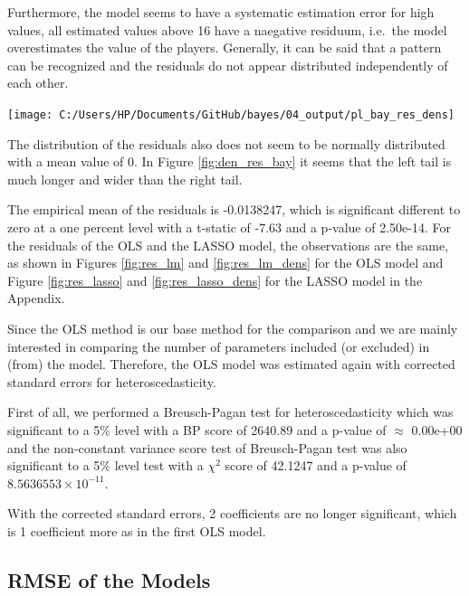 \documentclass[12pt,a4paper]{article}
\let\origfigure\figure
\let\endorigfigure\endfigure
\renewenvironment{figure}[1][2] {
    \expandafter\origfigure\expandafter[H]
} {
    \endorigfigure
}
\begin{document}
Furthermore, the model seems to have a systematic estimation error for
high values, all estimated values above 16 have a naegative residuum,
i.e.~the model overestimates the value of the players. Generally, it can
be said that a pattern can be recognized and the residuals do not appear
distributed independently of each other.

\begin{figure}

\texttt{[image: C:/Users/HP/Documents/GitHub/bayes/04\_output/pl\_bay\_res\_dens]} \hfill{}

\caption{ \label{fig:den_res_bay} Distribution of the Residuals of the Bayesian LASSO}\label{fig:fig_dens_2}
\end{figure}

The distribution of the residuals also does not seem to be normally
distributed with a mean value of 0. In Figure \ref{fig:den_res_bay} it
seems that the left tail is much longer and wider than the right tail.

The empirical mean of the residuals is -0.0138247, which is significant
different to zero at a one percent level with a t-static of -7.63 and a
p-value of 2.50e-14. For the residuals of the \ac{OLS} and the
\ac{LASSO} model, the observations are the same, as shown in Figures
\ref{fig:res_lm} and \ref{fig:res_lm_dens} for the \ac{OLS} model and
Figure \ref{fig:res_lasso} and \ref{fig:res_lasso_dens} for the
\ac{LASSO} model in the Appendix.

Since the \acf{OLS} method is our base method for the comparison and we
are mainly interested in comparing the number of parameters included (or
excluded) in (from) the model. Therefore, the \ac{OLS} model was
estimated again with corrected standard errors for heteroscedasticity.

First of all, we performed a Breusch-Pagan test for heteroscedasticity
which was significant to a 5\% level with a BP score of 2640.89 and a
p-value of \(\approx\) 0.00e+00 and the non-constant variance score test
of Breusch-Pagan test was also significant to a 5\% level test with a
\(\chi^2\) score of 42.1247 and a p-value of
\ensuremath{8.5636553\times 10^{-11}}.

With the corrected standard errors, 2 coefficients are no longer
significant, which is 1 coefficient more as in the first \ac{OLS} model.

\hypertarget{of-the-models}{%
\subsection{\texorpdfstring{\acf{RMSE} of the
Models}{ of the Models}}\label{of-the-models}}
\end{document}
